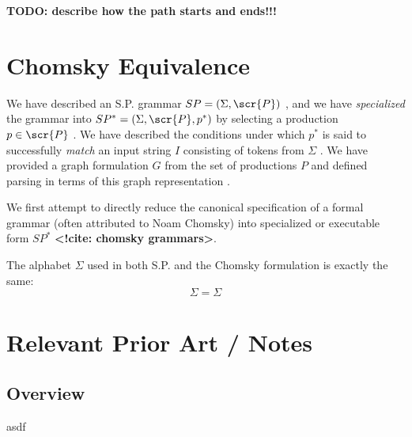 \documentclass[10pt]{article}
\newcommand{\todocite}[1]{\textbf{<!cite: #1>}}
\begin{document}
\textbf{TODO: describe how the path starts and ends!!!}

\section{Chomsky Equivalence}
\label{sec:chomsky-equivalence}
We have described an S.P. grammar $SP = (\Sigma, \scr{P})$ , and we have \textit{specialized} the grammar into $SP^* = (\Sigma, \scr{P}, p^*)$ by selecting a production $p \in \scr{P}$ . We have described the conditions under which $p^*$ is said to successfully \textit{match} an input string $I$ consisting of tokens from $\Sigma$ . We have provided a graph formulation $G$ from the set of productions $P$ and defined parsing in terms of this graph representation .

We first attempt to directly reduce the canonical specification of a formal grammar (often attributed to Noam Chomsky) into specialized or executable form $SP^*$ \todocite{chomsky grammars}.

The alphabet $\Sigma$ used in both S.P. and the Chomsky formulation is exactly the same:
\begin{equation}\label{eq:alphabet}
  \Sigma = \Sigma
\end{equation}

\section{Relevant Prior Art / Notes}
\subsection{Overview}
\label{sec:overview}

asdf
\end{document}
